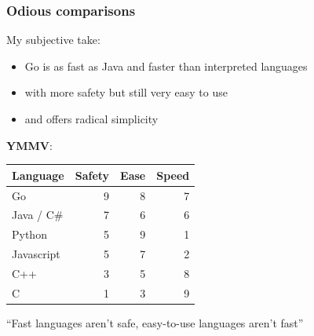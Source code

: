 \documentclass[handout,compress,t,11pt]{beamer}
\begin{document}
\begin{frame}
    \frametitle{Odious comparisons}
    My subjective take:
    \begin{itemize}
    \item Go is as fast as Java and faster than interpreted languages
    \item with more safety but still very easy to use
    \item and offers radical simplicity
    \end{itemize}

    \vspace{\baselineskip}
    {\bf YMMV}:
    \vspace{-1.62\baselineskip}
    \begin{table}[h!]
        \begin{tabular}{l||r|r|r}
        \textbf{Language}& \textbf{Safety} & \textbf{Ease} & \textbf{Speed}  \\
        \hline \hline
        Go           & 9 & 8 & 7  \\
        \hline
        Java / C\#   & 7 & 6 & 6  \\
        \hline
        Python       & 5 & 9 & 1  \\
        \hline
        Javascript   & 5 & 7 & 2  \\
        \hline
        C++          & 3 & 5 & 8  \\
        \hline
        C            & 1 & 3 & 9  \\
        \end{tabular}
    \end{table}
    \vspace{0.4\baselineskip}
    ``Fast languages aren't safe, easy-to-use languages aren't fast''
\end{frame}


\end{document}

